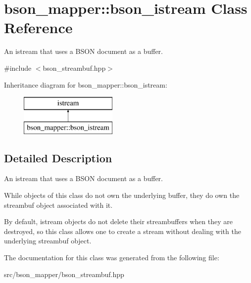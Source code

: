 \hypertarget{classbson__mapper_1_1bson__istream}{}\section{bson\+\_\+mapper\+:\+:bson\+\_\+istream Class Reference}
\label{classbson__mapper_1_1bson__istream}


An istream that uses a B\+S\+ON document as a buffer.  




{\ttfamily \#include $<$bson\+\_\+streambuf.\+hpp$>$}

Inheritance diagram for bson\+\_\+mapper\+:\+:bson\+\_\+istream\+:\begin{figure}[H]
\begin{center}
\leavevmode
\includegraphics[height=2.000000cm]{classbson__mapper_1_1bson__istream}
\end{center}
\end{figure}


\subsection{Detailed Description}
An istream that uses a B\+S\+ON document as a buffer. 

While objects of this class do not own the underlying buffer, they do own the streambuf object associated with it.

By default, istream objects do not delete their streambuffers when they are destroyed, so this class allows one to create a stream without dealing with the underlying streambuf object. 

The documentation for this class was generated from the following file\+:\begin{DoxyCompactItemize}
\item 
src/bson\+\_\+mapper/bson\+\_\+streambuf.\+hpp\end{DoxyCompactItemize}
